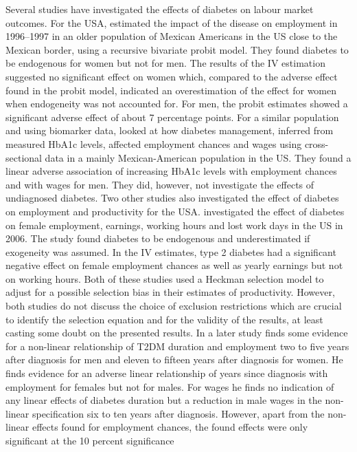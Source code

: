 \documentclass[12pt,english,british]{article}
\begin{document}
Several studies have investigated the effects of diabetes on labour market outcomes. For the USA, \citet{Brown2005}  estimated the impact of the disease on employment in 1996--1997 in an older population of Mexican Americans in the \ac{US} close to the Mexican border, using a recursive bivariate probit model. They found diabetes to be endogenous for women but not for men. The results of the \ac{IV} estimation suggested no significant effect on women which, compared to the adverse effect found in the probit model, indicated an overestimation of the effect for women when endogeneity was not accounted for. For men, the probit estimates showed a significant adverse effect of about 7 percentage points. For a similar population and using biomarker data,\citet{BrownIII2011} looked at how diabetes management, inferred from measured \ac{HbA1c} levels,
affected employment chances and wages using cross-sectional data in
a mainly Mexican-American population in the US. They found a linear adverse association of increasing \ac{HbA1c} levels with
employment chances and with wages for men. They did, however, not investigate the effects of undiagnosed diabetes. Two other studies also investigated the effect of diabetes on employment and productivity for the USA. \citep{Minor2010} investigated the effect of diabetes on female employment, earnings, working hours and lost work days in the \ac{US} in 2006. The study found diabetes to be endogenous and underestimated if exogeneity was assumed. In the \ac{IV} estimates, type 2 diabetes had a significant negative effect on female employment chances as well as yearly earnings but not on working hours. Both of these studies used a Heckman selection model to adjust for a possible selection bias in their estimates of productivity. However, both studies do not discuss the choice of exclusion restrictions which are crucial to identify the selection equation and for the validity of the results, at least casting some doubt on the presented results. In a later study \citet{Minor2013}
finds some evidence for a non-linear relationship of \ac{T2DM} duration
and employment two to five years after diagnosis for men and eleven
to fifteen years after diagnosis for women. He finds evidence for
an adverse linear relationship of years since diagnosis with employment
for females but not for males. For wages he finds no indication of
any linear effects of diabetes duration but a reduction in male wages
in the non-linear specification six to ten years after diagnosis.
However, apart from the non-linear effects found for employment chances,
the found effects were only significant at the 10 percent significance
\end{document}
